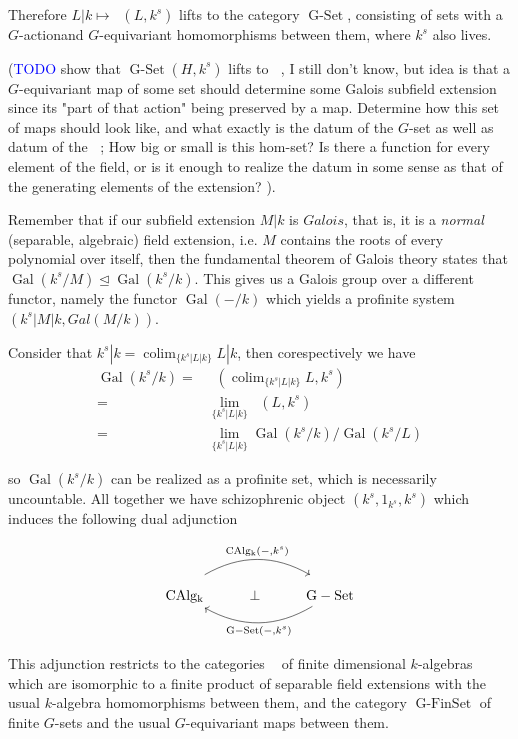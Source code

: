 \documentclass[12pt,a4paper]{article}
\DeclareMathOperator{\Gal}{Gal}
\DeclareMathOperator{\colim}{colim}
\DeclareMathOperator{\CAlgk}{CAlg_k}
\DeclareMathOperator{\GSet}{G-Set}
\DeclareMathOperator{\GFSet}{G-FinSet}
\DeclareMathOperator{\ket}{k_{\text{ét}}}
\begin{document}
Therefore $L|k \mapsto \CAlgk(L, k^s)$ lifts to the category $\GSet$, consisting of sets with a $G$-actionand $G$-equivariant homomorphisms between them, where $k^s$ also lives.

(\textcolor{blue}{TODO} show that $\GSet(H,k^s)$ lifts to $\CAlgk$, I still don't know, but idea is that  a $G$-equivariant map of some set should determine some Galois subfield extension since its "part of that action" being preserved by a map. Determine how this set of maps should look like, and what exactly is the datum of the $G$-set as well as datum of the $\CAlgk$; How big or small is this hom-set? Is there a function for every element of the field, or is it enough to realize the datum in some sense as that of the generating elements of the extension? ). 

Remember that if our subfield extension $M|k$ is $Galois$, that is,  it is a \emph{normal} (separable, algebraic) field extension, i.e. $M$ contains the roots of every polynomial over itself, then the fundamental theorem of Galois theory states that $\Gal(k^s/M) \unlhd \Gal(k^s/k)$. This gives us a Galois group over a different functor, namely the functor $\Gal(-/k)$ which yields a profinite system $({k^s|M|k} , Gal(M/k))$.

Consider that $k^s|k = \colim_{\{k^s|L|k\}}L|k$, then corespectively we have \begin{align*}
	\Gal(k^s/k)=& \CAlgk(\colim_{\{k^s|L|k\}}L, k^s)\\ =& \lim_{\{k^s|L|k\}}\CAlgk(L,k^s)\\ =& \lim_{\{k^s|L|k\}}\Gal(k^s/k)/\Gal(k^s/L)
\end{align*}

so $\Gal(k^s/k)$ can be realized as a profinite set, which is necessarily uncountable. 
All together we have schizophrenic object $(k^s,1_{k^s},k^s)$ which induces the following dual adjunction


 \[\begin{tikzcd}
	\CAlgk & \bot & \GSet
	\arrow["{\CAlgk(-, k^s)}", shift left=3, bend left, from=1-1, to=1-3]
	\arrow["{\GSet(-, k^s)}", bend left, from=1-3, to=1-1]
\end{tikzcd}\]

This adjunction restricts to the categories $\ket$ of finite dimensional $k$-algebras which are isomorphic to a finite product of separable field extensions with the usual $k$-algebra homomorphisms between them, and the category $\GFSet$ of finite $G$-sets and the usual $G$-equivariant maps between them. 
\end{document}
